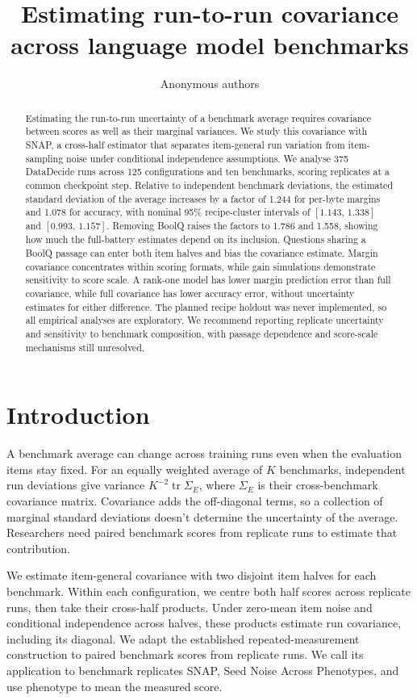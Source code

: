 \documentclass{article}
\title{Estimating run-to-run covariance\\across language model benchmarks}
\author{Anonymous authors}
\newcommand{\ci}[2]{\ensuremath{[#1,\,#2]}}
\newcommand{\Sig}{\Sigma_E}
\begin{document}
\maketitle
\begin{abstract}
Estimating the run-to-run uncertainty of a benchmark average requires covariance between scores as well as their marginal variances. We study this covariance with SNAP, a cross-half estimator that separates item-general run variation from item-sampling noise under conditional independence assumptions. We analyse 375 DataDecide runs across 125 configurations and ten benchmarks, scoring replicates at a common checkpoint step. Relative to independent benchmark deviations, the estimated standard deviation of the average increases by a factor of 1.244 for per-byte margins and 1.078 for accuracy, with nominal 95\% recipe-cluster intervals of \ci{1.143}{1.338} and \ci{0.993}{1.157}. Removing BoolQ raises the factors to 1.786 and 1.558, showing how much the full-battery estimates depend on its inclusion. Questions sharing a BoolQ passage can enter both item halves and bias the covariance estimate. Margin covariance concentrates within scoring formats, while gain simulations demonstrate sensitivity to score scale. A rank-one model has lower margin prediction error than full covariance, while full covariance has lower accuracy error, without uncertainty estimates for either difference. The planned recipe holdout was never implemented, so all empirical analyses are exploratory. We recommend reporting replicate uncertainty and sensitivity to benchmark composition, with passage dependence and score-scale mechanisms still unresolved.
\end{abstract}

\section{Introduction}
A benchmark average can change across training runs even when the evaluation items stay fixed. For an equally weighted average of $K$ benchmarks, independent run deviations give variance $K^{-2}\operatorname{tr}\Sig$, where $\Sig$ is their cross-benchmark covariance matrix. Covariance adds the off-diagonal terms, so a collection of marginal standard deviations doesn't determine the uncertainty of the average. Researchers need paired benchmark scores from replicate runs to estimate that contribution.

We estimate item-general covariance with two disjoint item halves for each benchmark. Within each configuration, we centre both half scores across replicate runs, then take their cross-half products. Under zero-mean item noise and conditional independence across halves, these products estimate run covariance, including its diagonal. We adapt the established repeated-measurement construction to paired benchmark scores from replicate runs. We call its application to benchmark replicates SNAP, Seed Noise Across Phenotypes, and use phenotype to mean the measured score.
\end{document}
